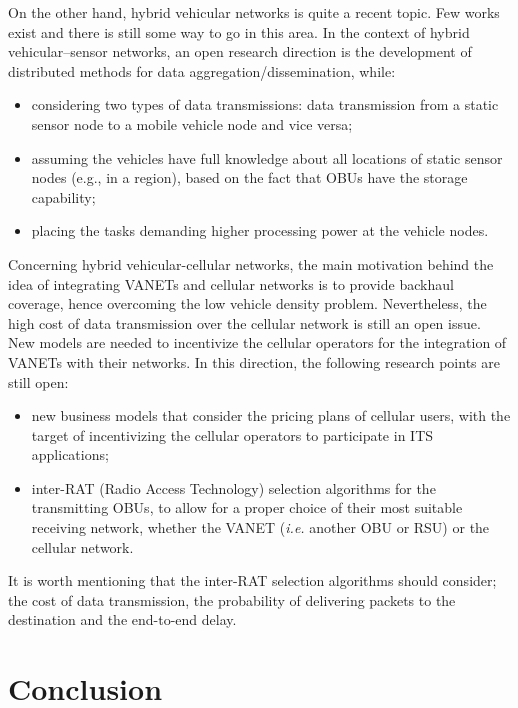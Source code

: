 \documentclass[10pt,onecolumn]{article}
\begin{document}
On the other hand, hybrid vehicular networks is quite a recent topic. Few works exist and there is still some way to go in this area. 
In the context of hybrid vehicular--sensor networks, an open research direction is the development of distributed methods for data aggregation/dissemination, while:
\begin{itemize}
\item considering two types of data transmissions: data transmission from a static sensor node to a mobile vehicle node and vice versa;
\item assuming the vehicles have full knowledge about all locations of static sensor nodes (e.g., in a region), based on the fact that OBUs have the storage capability;
\item placing the tasks demanding higher processing power at the vehicle nodes.                                                                                         
\end{itemize}
Concerning hybrid vehicular-cellular networks, the main motivation behind the idea of integrating VANETs and cellular networks is to provide backhaul coverage, hence overcoming the low vehicle density problem.
Nevertheless, the high cost of data transmission over the cellular network is still an open issue. New models are needed to incentivize the cellular operators for the integration of VANETs with their networks.
In this direction, the following research points are still open: 
\begin{itemize}
\item 
new business models that consider the pricing plans of cellular users, with the target of incentivizing the cellular operators to participate in ITS applications;
\item
inter-RAT (Radio Access Technology) selection algorithms for the transmitting OBUs, to allow for a proper choice of their most suitable receiving network, whether the VANET (\textit{i.e.} another OBU or RSU) or the cellular network. 
\end{itemize}
It is worth mentioning that the inter-RAT selection algorithms should consider; the cost of data transmission, the probability of delivering packets to the destination and the end-to-end delay. 



\section{Conclusion}
\label{conc}
\end{document}
